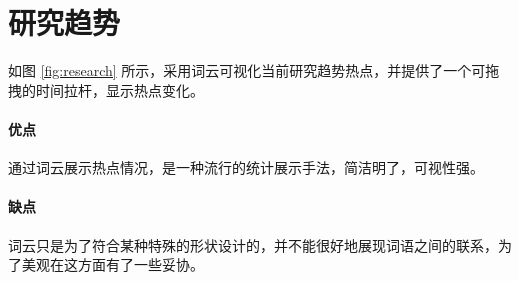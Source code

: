     \section{研究趋势}

    如图 \ref{fig:research} 所示，采用词云可视化当前研究趋势热点，并提供了一个可拖拽的时间拉杆，显示热点变化。

    \paragraph{优点} 通过词云展示热点情况，是一种流行的统计展示手法，简洁明了，可视性强。

    \paragraph{缺点} 词云只是为了符合某种特殊的形状设计的，并不能很好地展现词语之间的联系，为了美观在这方面有了一些妥协。

    \small
    
